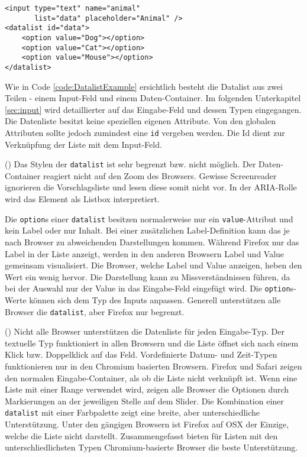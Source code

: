 \begin{lstlisting}[style = htmlcssjs, caption = Datalist Example, label = code:DatalistExample]
<input type="text" name="animal" 
       list="data" placeholder="Animal" />
<datalist id="data">
    <option value="Dog"></option>
    <option value="Cat"></option>
    <option value="Mouse"></option>
</datalist>
\end{lstlisting}

Wie in Code \ref{code:DatalistExample} ersichtlich besteht die Datalist aus zwei Teilen - einem Input-Feld und einem Daten-Container. 
Im folgenden Unterkapitel \ref{sec:input} wird detaillierter auf das Eingabe-Feld und dessen Typen eingegangen.
Die Datenliste besitzt keine speziellen eigenen Attribute.
Von den globalen Attributen sollte jedoch zumindest eine \texttt{id} vergeben werden.
Die Id dient zur Verknüpfung der Liste mit dem Input-Feld. 

(\cite{datalistMdn}) Das Stylen der \texttt{datalist} ist sehr begrenzt bzw. nicht möglich. 
Der Daten-Container reagiert nicht auf den Zoom des Browsers.
Gewisse Screenreader ignorieren die Vorschlagsliste und lesen diese somit nicht vor.
In der ARIA-Rolle wird das Element als Listbox interpretiert.

Die \texttt{option}s einer \texttt{datalist} besitzen normalerweise nur ein \texttt{value}-Attribut und kein Label oder nur Inhalt.
Bei einer zusätzlichen Label-Definition kann das je nach Browser zu abweichenden Darstellungen kommen. 
Während Firefox nur das Label in der Liste anzeigt, werden in den anderen Browsern Label und Value gemeinsam visualisiert. 
Die Browser, welche Label und Value anzeigen, heben den Wert ein wenig hervor.
Die Darstellung kann zu Missverständnissen führen, da bei der Auswahl nur der Value in das Eingabe-Feld eingefügt wird. 
Die \texttt{option}s-Werte können sich dem Typ des Inputs anpassen. 
Generell unterstützen alle Browser die \texttt{datalist}, aber Firefox nur begrenzt.

(\cite{datalistMdn}) Nicht alle Browser unterstützen die Datenliste für jeden Eingabe-Typ.
Der textuelle Typ funktioniert in allen Browsern und die Liste öffnet sich nach einem Klick bzw. Doppelklick auf das Feld.
Vordefinierte Datum- und Zeit-Typen funktionieren nur in den Chromium basierten Browsern. 
Firefox und Safari zeigen den normalen Eingabe-Container, als ob die Liste nicht verknüpft ist.
Wenn eine Liste mit einer Range verwendet wird, zeigen alle Browser die Optionen durch Markierungen an der jeweiligen Stelle auf dem Slider.
Die Kombination einer \texttt{datalist} mit einer Farbpalette zeigt eine breite, aber unterschiedliche Unterstützung. 
Unter den gängigen Browsern ist Firefox auf OSX der Einzige, welche die Liste nicht darstellt.
Zusammengefasst bieten für Listen mit den unterschliedlichsten Typen Chromium-basierte Browser die beste Unterstützung.


